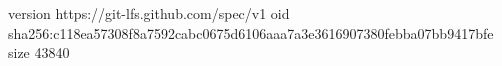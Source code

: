 version https://git-lfs.github.com/spec/v1
oid sha256:c118ea57308f8a7592cabc0675d6106aaa7a3e3616907380febba07bb9417bfe
size 43840
